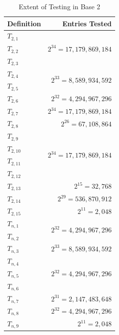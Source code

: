 \documentclass[conference]{IEEEtran}
\begin{document}
\renewcommand{\arraystretch}{1.25}
\begin{table}[H]
\label{tab:testing_b2}
\caption{Extent of Testing in Base 2}
\centering
\begin{tabular}{|l|r|}
\hline
\textbf{Definition} & \textbf{Entries Tested}      \\ \hline
$T_{2,1}$  &\multirow{3}{*}{$2^{34}=17,179,869,184$}\\ \cline{1-1}
$T_{2,2}$  &                              \\ \cline{1-1}
$T_{2,3}$  &                              \\ \hline
$T_{2,4}$  &\multirow{2}{*}{$2^{33}=8,589,934,592$}\\ \cline{1-1}
$T_{2,5}$  &                              \\ \hline
$T_{2,6}$  & $2^{32} = 4,294,967,296$     \\ \hline
$T_{2,7}$  & $2^{34} = 17,179,869,184$    \\ \hline
$T_{2,8}$  & $2^{26} = 67,108,864$        \\ \hline
$T_{2,9}$  &\multirow{4}{*}{$2^{34}=17,179,869,184$}\\ \cline{1-1}
$T_{2,10}$ &                              \\ \cline{1-1}
$T_{2,11}$ &                              \\ \cline{1-1}
$T_{2,12}$ &                              \\ \hline
$T_{2,13}$ & $2^{15} = 32,768$            \\ \hline
$T_{2,14}$ & $2^{29} = 536,870,912$       \\ \hline
$T_{2,15}$ & $2^{11} = 2,048$             \\ \hline
$T_{n,1}$  &\multirow{2}{*}{$2^{32}=4,294,967,296$}\\ \cline{1-1}
$T_{n,2}$  &                              \\ \hline
$T_{n,3}$  & $2^{33} = 8,589,934,592$     \\ \hline
$T_{n,4}$  &\multirow{3}{*}{$2^{32}=4,294,967,296$}\\ \cline{1-1}
$T_{n,5}$  &                              \\ \cline{1-1}
$T_{n,6}$  &                              \\ \hline
$T_{n,7}$  & $2^{31} = 2,147,483,648$     \\ \hline
$T_{n,8}$  & $2^{32} = 4,294,967,296$     \\ \hline
$T_{n,9}$  & $2^{11} = 2,048$             \\ \hline
\end{tabular}
\end{table}
\end{document}

